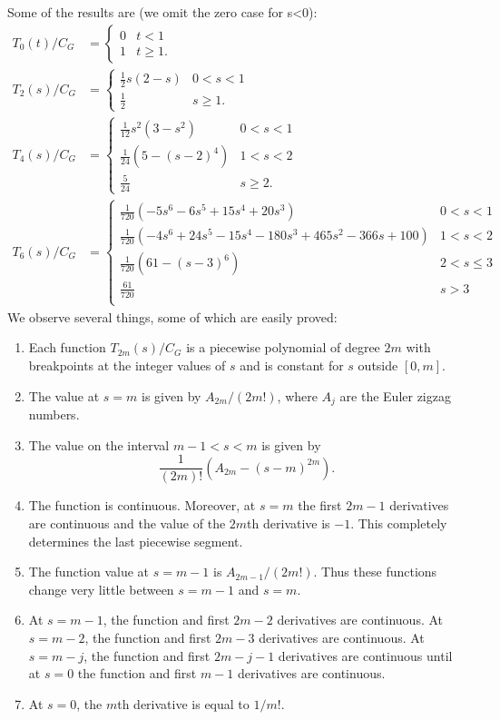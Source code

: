 \documentclass[11pt]{article}
\begin{document}
Some of the results are (we omit the zero case for s<0):
\begin{align}
T_0(t)/C_G & = 
    \begin{cases} 0 & t<1  \\ 1 & t \ge 1.
    \end{cases} \\
T_2(s)/C_G & =
    \begin{cases} \frac{1}{2}s(2-s) & 0<s<1  \\
                    \frac{1}{2} & s \ge 1.
    \end{cases} \\
T_4(s)/C_G & =
    \begin{cases} \frac{1}{12}s^2(3-s^2) & 0<s<1  \\
                    \frac{1}{24}\left(5-(s-2)^4\right) & 1 < s < 2 \\
                    \frac{5}{24} & s \ge 2.
    \end{cases} \\
T_6(s)/C_G & = 
\begin{cases}
 \frac{1}{720} \left(-5 s^6-6 s^5+15 s^4+20 s^3\right) & 0<s<1 \\
 \frac{1}{720} \left(-4 s^6+24 s^5-15 s^4-180 s^3+465 s^2-366 s+100\right) & 1<s<2 \\
 \frac{1}{720} \left(61-(s-3)^6\right) & 2<s\leq 3 \\
 \frac{61}{720} & s>3 \\
\end{cases}
\end{align}
We observe several things, some of which are easily proved:
\begin{enumerate}
    \item Each function $T_{2m}(s)/C_G$ is a piecewise polynomial of degree $2m$
            with breakpoints at the integer values of $s$ and is constant for
            $s$ outside $[0,m]$.
    \item The value at $s=m$ is given by $A_{2m}/(2m!)$, where $A_j$ are the Euler
            zigzag numbers.
    \item The value on the interval $m-1<s<m$ is given by
        $$
            \frac{1}{(2m)!}\left(A_{2m} - (s-m)^{2m}\right).
        $$
    \item The function is continuous.  Moreover, at $s=m$ the first $2m-1$ derivatives are
        continuous and the value of the $2m$th derivative is $-1$.  This completely
        determines the last piecewise segment.
    \item The function value at $s=m-1$ is $A_{2m-1}/(2m!)$.  Thus these functions
        change very little between $s=m-1$ and $s=m$.
    \item At $s=m-1$, the function and first $2m-2$ derivatives are continuous.  At $s=m-2$,
            the function and first $2m-3$ derivatives are continuous.  At $s=m-j$, the
            function and first $2m-j-1$ derivatives are continuous until at $s=0$
            the function and first $m-1$ derivatives are continuous.
    \item At $s=0$, the $m$th derivative is equal to $1/m!$.
\end{enumerate}
\end{document}
